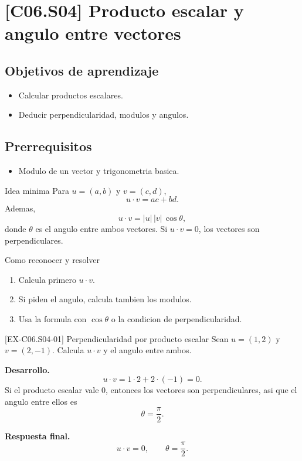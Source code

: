 \section{[C06.S04] Producto escalar y angulo entre vectores}

\subsection*{Objetivos de aprendizaje}
\begin{itemize}
  \item Calcular productos escalares.
  \item Deducir perpendicularidad, modulos y angulos.
\end{itemize}

\subsection*{Prerrequisitos}
\begin{itemize}
  \item Modulo de un vector y trigonometria basica.
\end{itemize}

\begin{theorybox}{Idea minima}
Para \(u=(a,b)\) y \(v=(c,d)\),
\[
u\cdot v=ac+bd.
\]
Ademas,
\[
u\cdot v=|u|\,|v|\,\cos \theta,
\]
donde \(\theta\) es el angulo entre ambos vectores. Si \(u\cdot v=0\), los vectores son
perpendiculares.
\end{theorybox}

\begin{methodbox}{Como reconocer y resolver}
\begin{enumerate}
  \item Calcula primero \(u\cdot v\).
  \item Si piden el angulo, calcula tambien los modulos.
  \item Usa la formula con \(\cos \theta\) o la condicion de perpendicularidad.
\end{enumerate}
\end{methodbox}

\begin{solvedexample}{[EX-C06.S04-01] Perpendicularidad por producto escalar}
Sean \(u=(1,2)\) y \(v=(2,-1)\). Calcula \(u\cdot v\) y el angulo entre ambos.

\textbf{Desarrollo.}
\[
u\cdot v=1\cdot 2+2\cdot (-1)=0.
\]
Si el producto escalar vale \(0\), entonces los vectores son perpendiculares, asi que el angulo
entre ellos es
\[
\theta=\frac{\pi}{2}.
\]

\textbf{Respuesta final.}
\[
u\cdot v=0,
\qquad
\theta=\frac{\pi}{2}.
\]
\end{solvedexample}


